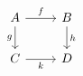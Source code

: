 \documentclass{article}
\begin{document}
\[
\begin{tikzcd}
A \arrow[r,"f"] \arrow[d,"g"'] & B \arrow[d,"h"] \\
C \arrow[r,"k"']               & D
\end{tikzcd}
\]
\end{document}

